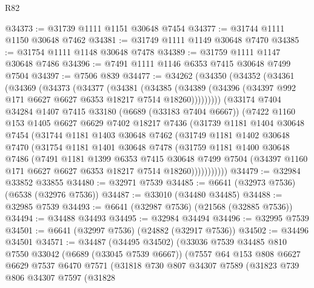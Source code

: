 \begin{lexlean}{R82}
\begin{coremodule}
@34373 := @31739 @1111 @1151 @30648 @7454
@34377 := @31744 @1111 @1150 @30648 @7462
@34381 := @31749 @1111 @1149 @30648 @7470
@34385 := @31754 @1111 @1148 @30648 @7478
@34389 := @31759 @1111 @1147 @30648 @7486
@34396 := @7491 @1111 @1146 @6353 @7415 @30648 @7499 @7504
@34397 := @7506 @839
@34477 := @34262
    (@34350
      (@34352
        (@34361
          (@34369
            (@34373
              (@34377
                (@34381
                  (@34385
                    (@34389 (@34396 (@34397 @992 @171 @6627 @6627 @6353 @18217 @7514 @18260)))))))))
        (@33174
          @7404
          @34284
          @1407
          @7415
          @33180
          (@6689 (@33183 @7404 @6667))
          (@7422
            @1160
            @153
            @1405
            @6627
            @6629
            @7402
            @18217
            @7436
            (@31739
              @1181
              @1404
              @30648
              @7454
              (@31744
                @1181
                @1403
                @30648
                @7462
                (@31749
                  @1181
                  @1402
                  @30648
                  @7470
                  (@31754
                    @1181
                    @1401
                    @30648
                    @7478
                    (@31759
                      @1181
                      @1400
                      @30648
                      @7486
                      (@7491
                        @1181
                        @1399
                        @6353
                        @7415
                        @30648
                        @7499
                        @7504
                        (@34397 @1160 @171 @6627 @6627 @6353 @18217 @7514 @18260)))))))))))
@34479 := @32984 @33852 @33855
@34480 := @32971 @7539
@34485 := @6641 (@32973 @7536) (@6538 (@32976 @7536))
@34487 := @33010 (@34480 @34485)
@34488 := @32985 @7539
@34493 := @6641 (@32987 @7536) (@21568 (@32885 @7536))
@34494 := @34488 @34493
@34495 := @32984 @34494
@34496 := @32995 @7539
@34501 := @6641 (@32997 @7536) (@24882 (@32917 @7536))
@34502 := @34496 @34501
@34571 := @34487
    (@34495 @34502)
    (@33036
      @7539
      @34485
      @810
      @7550
      @33042
      (@6689 (@33045 @7539 @6667))
      (@7557
        @64
        @153
        @808
        @6627
        @6629
        @7537
        @6470
        @7571
        (@31818
          @730
          @807
          @34307
          @7589
          (@31823
            @739
            @806
            @34307
            @7597
            (@31828

\end{coremodule}
\end{lexlean}
